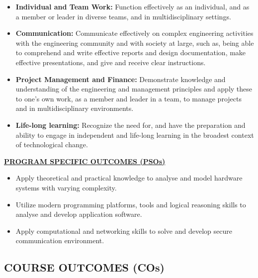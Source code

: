 \documentclass[a4paper,12pt]{report}
\begin{document}
\begin{itemize}[leftmargin=2.5cm]
    \item[\textbf{PO9.}] \textbf{Individual and Team Work:} Function effectively as an individual, and as a member or leader in diverse teams, and in multidisciplinary settings.
    
    \item[\textbf{PO10.}] \textbf{Communication:} Communicate effectively on complex engineering activities with the engineering community and with society at large, such as, being able to comprehend and write effective reports and design documentation, make effective presentations, and give and receive clear instructions.
    
    \item[\textbf{PO11.}] \textbf{Project Management and Finance:} Demonstrate knowledge and understanding of the engineering and management principles and apply these to one's own work, as a member and leader in a team, to manage projects and in multidisciplinary environments.
    
    \item[\textbf{PO12.}] \textbf{Life-long learning:} Recognize the need for, and have the preparation and ability to engage in independent and life-long learning in the broadest context of technological change.
\end{itemize}

\vspace{1cm}

\begin{center}
    \textbf{\underline{PROGRAM SPECIFIC OUTCOMES (PSOs)}}
\end{center}
\vspace{0.5cm}

\begin{itemize}[leftmargin=2.5cm]
    \item[\textbf{PSO1:}] Apply theoretical and practical knowledge to analyse and model hardware systems with varying complexity.
    \item[\textbf{PSO2:}] Utilize modern programming platforms, tools and logical reasoning skills to analyse and develop application software.
    \item[\textbf{PSO3:}] Apply computational and networking skills to solve and develop secure communication environment.
\end{itemize}

\newpage
\subsection*{COURSE OUTCOMES (COs)}
\end{document}
